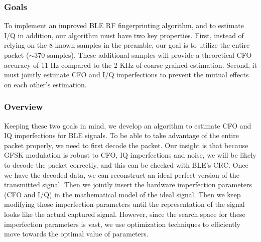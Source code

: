 %

%
%

\subsubsection{Goals}
%
To implement an improved BLE RF fingerprinting algorithm, and to estimate I/Q
in addition, our algorithm must have two key properties.
%
First, instead of relying on the 8 known samples in the preamble, our goal is
to utilize the entire packet ($\sim$370 samples).
These additional samples will provide a theoretical CFO accuracy of 
11 Hz compared to the 2 KHz of coarse-grained
estimation.
%
Second, it must jointly estimate CFO and I/Q imperfections to prevent the
mutual effects on each other's estimation.

\subsubsection{Overview}
%
Keeping these two goals in mind, we develop an algorithm to estimate CFO and IQ
imperfections for BLE signals.
%
To be able to take advantage of the entire packet properly, we need to first
decode the packet. Our insight is that because GFSK modulation is robust to CFO, IQ imperfections and noise,
we will be likely to decode the packet correctly, and this can be checked with
BLE's CRC.
%
Once we have the decoded data, we can reconstruct an ideal perfect version of
the transmitted signal.
%
Then we jointly insert the hardware imperfection parameters (CFO and I/Q) in the
mathematical model of the ideal signal. Then we keep modifying those
imperfection parameters until the representation of the signal
looks like the actual captured signal. However, since the search space for
these imperfection parameters is vast, we use optimization techniques to
efficiently move towards the optimal value of parameters.


